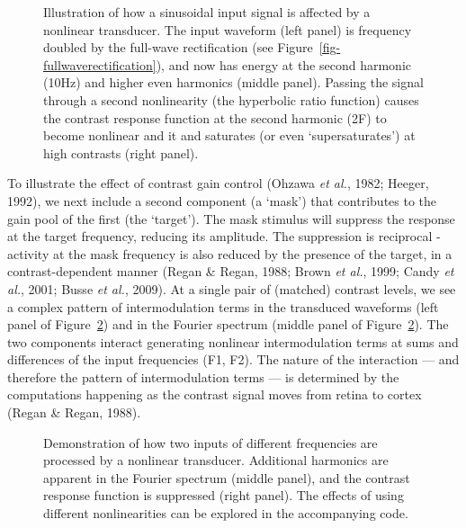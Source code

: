 \documentclass[
  letterpaper,
  DIV=11,
  numbers=noendperiod]{scrartcl}
\begin{document}
\begin{figure}


\caption{\label{fig-transducer}Illustration of how a sinusoidal input
signal is affected by a nonlinear transducer. The input waveform (left
panel) is frequency doubled by the full-wave rectification (see
Figure~\ref{fig-fullwaverectification}), and now has energy at the
second harmonic (10Hz) and higher even harmonics (middle panel). Passing
the signal through a second nonlinearity (the hyperbolic ratio function)
causes the contrast response function at the second harmonic (2F) to
become nonlinear and it and saturates (or even `supersaturates') at high
contrasts (right panel).}

\end{figure}%

To illustrate the effect of contrast gain control (Ohzawa \emph{et al.},
1982; Heeger, 1992), we next include a second component (a `mask') that
contributes to the gain pool of the first (the `target'). The mask
stimulus will suppress the response at the target frequency, reducing
its amplitude. The suppression is reciprocal - activity at the mask
frequency is also reduced by the presence of the target, in a
contrast-dependent manner (Regan \& Regan, 1988; Brown \emph{et al.},
1999; Candy \emph{et al.}, 2001; Busse \emph{et al.}, 2009). At a single
pair of (matched) contrast levels, we see a complex pattern of
intermodulation terms in the transduced waveforms (left panel of
Figure~\ref{fig-twoinputs}) and in the Fourier spectrum (middle panel of
Figure~\ref{fig-twoinputs}). The two components interact generating
nonlinear intermodulation terms at sums and differences of the input
frequencies (F1, F2). The nature of the interaction --- and therefore
the pattern of intermodulation terms --- is determined by the
computations happening as the contrast signal moves from retina to
cortex (Regan \& Regan, 1988).

\begin{figure}


\caption{\label{fig-twoinputs}Demonstration of how two inputs of
different frequencies are processed by a nonlinear transducer.
Additional harmonics are apparent in the Fourier spectrum (middle
panel), and the contrast response function is suppressed (right panel).
The effects of using different nonlinearities can be explored in the
accompanying code.}

\end{figure}%
\end{document}
